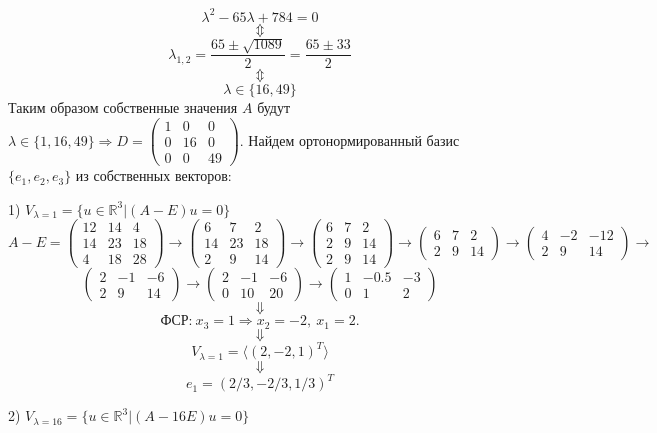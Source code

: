 \documentclass{article}
\begin{document}
$$\lambda^2-65\lambda+784=0$$
$$\Updownarrow$$
$$\lambda_{1,2}=\frac{65\pm\sqrt{1089}}{2}=\frac{65\pm33}{2}$$
$$\Updownarrow$$
$$\lambda\in\{16,49\}$$
Таким образом собственные значения $A$ будут $\lambda\in\{1,16,49\}\Rightarrow D=\left(\begin{array}{rrr}1 & 0 & 0\\0 & 16 & 0\\0 & 0 & 49\end{array}\right)$. Найдем ортонормированный базис $\{e_1,e_2,e_3\}$ из собственных векторов:
\par
1) $V_{\lambda=1}=\{u\in\mathbb{R}^3|(A-E)u=0\}$
$$A-E=\left(\begin{array}{rrr}12 & 14 & 4\\14 & 23 & 18\\4 & 18 & 28\end{array}\right)\rightarrow\left(\begin{array}{rrr}6 & 7 & 2\\14 & 23 & 18\\2 & 9 & 14\end{array}\right)\rightarrow\left(\begin{array}{rrr}6 & 7 & 2\\2 & 9 & 14\\2 & 9 & 14\end{array}\right)\rightarrow\left(\begin{array}{rrr}6 & 7 & 2\\2 & 9 & 14\end{array}\right)\rightarrow\left(\begin{array}{rrr}4 & -2 & -12\\2 & 9 & 14\end{array}\right)\rightarrow$$
$$\left(\begin{array}{rrr}2 & -1 & -6\\2 & 9 & 14\end{array}\right)\rightarrow\left(\begin{array}{rrr}2 & -1 & -6\\0 & 10 & 20\end{array}\right)\rightarrow\left(\begin{array}{rrr}1 & -0.5 & -3\\0 & 1 & 2\end{array}\right)$$
$$\Downarrow$$
$$\textrm{ФСР:}\ x_3=1\Rightarrow x_2 = -2,\ x_1=2.$$
$$\Downarrow$$
$$V_{\lambda=1}=\langle (2,-2,1)^T \rangle$$
$$\Downarrow$$
$$e_1=(2/3,-2/3,1/3)^T$$
\par
2) $V_{\lambda=16}=\{u\in\mathbb{R}^3|(A-16E)u=0\}$
\end{document}
